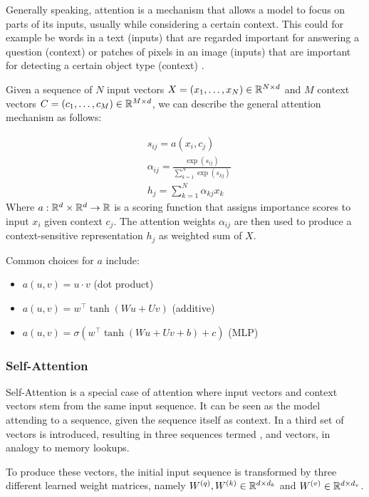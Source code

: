 Generally speaking, attention is a mechanism that allows a model to focus on parts of its inputs, usually while considering a certain context. This could for example be words in a text (inputs) that are regarded important for answering a question (context) \cite{xiong2016dynamic} or patches of pixels in an image (inputs) that are important for detecting a certain object type (context) \cite{xu2015show}.

Given a sequence of $N$ input vectors $X = (x_1, \dots, x_N) \in \mathbb{R}^{N \times d}$ and $M$ context vectors $C = (c_1, \dots, c_M) \in \mathbb{R}^{M \times d}$, we can describe the general attention mechanism as follows:

\begin{align}
     & s_{ij} = a(x_i, c_j)                                         \\
     & \alpha_{ij} = \frac{\exp(s_{ij})}{\sum_{k=1}^N \exp(s_{kj})} \\
     & h_j = \sum_{k=1}^N \alpha_{kj} x_k
\end{align}
Where $a: \mathbb{R}^d \times \mathbb{R}^d \rightarrow \mathbb{R}$ is a scoring function that assigns importance scores to input $x_i$ given context $c_j$. The attention weights $\alpha_{ij}$ are then used to produce a context-sensitive representation $h_j$ as weighted sum of $X$.

Common choices for $a$ include:
\begin{itemize}
    \item $a(u, v) = u \cdot v$ (dot product)
    \item $a(u, v) = w^\top \tanh(W u + U v)$ (additive)
    \item $a(u, v) = \sigma(w^\top \tanh(W u + U v + b) + c)$ (MLP)
\end{itemize}

\subsubsection{Self-Attention}
Self-Attention is a special case of attention where input vectors and context vectors stem from the same input sequence. It can be seen as the model attending to a sequence, given the sequence itself as context. In \cite{vaswani2017attention} a third set of  vectors is introduced, resulting in three sequences termed ,  and  vectors, in analogy to memory lookups.

To produce these vectors, the initial input sequence is transformed by three different learned weight matrices, namely $W^{(q)}, W^{(k)} \in \mathbb{R}^{d \times d_k}$ and $W^{(v)} \in \mathbb{R}^{d \times d_v}$.

